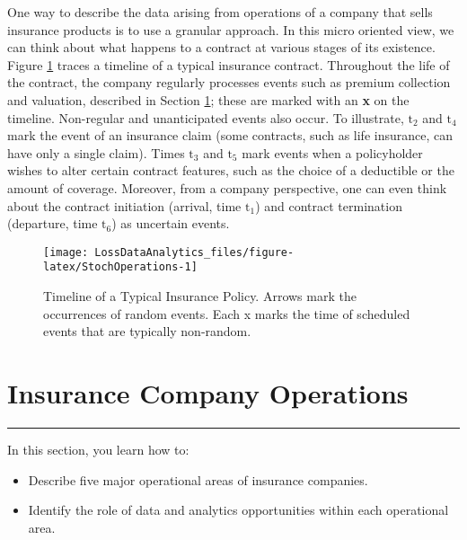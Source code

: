 \documentclass[]{book}
\providecommand{\tightlist}{%
  \setlength{\itemsep}{0pt}\setlength{\parskip}{0pt}}
\theoremstyle{definition}
\theoremstyle{definition}
\theoremstyle{definition}
\theoremstyle{remark}
\begin{document}
One way to describe the data arising from operations of a company that
sells insurance products is to use a granular approach. In this micro
oriented view, we can think about what happens to a contract at various
stages of its existence. Figure \ref{fig:StochOperations} traces a
timeline of a typical insurance contract. Throughout the life of the
contract, the company regularly processes events such as premium
collection and valuation, described in Section \ref{S:PredModApps};
these are marked with an \textbf{x} on the timeline. Non-regular and
unanticipated events also occur. To illustrate, \(\mathrm{t}_2\) and
\(\mathrm{t}_4\) mark the event of an insurance claim (some contracts,
such as life insurance, can have only a single claim). Times
\(\mathrm{t}_3\) and \(\mathrm{t}_5\) mark events when a policyholder
wishes to alter certain contract features, such as the choice of a
deductible or the amount of coverage. Moreover, from a company
perspective, one can even think about the contract initiation (arrival,
time \(\mathrm{t}_1\)) and contract termination (departure, time
\(\mathrm{t}_6\)) as uncertain events.





\begin{figure}

{\centering \texttt{[image: LossDataAnalytics\_files/figure-latex/StochOperations-1]} 

}

\caption{Timeline of a Typical Insurance Policy. Arrows
mark the occurrences of random events. Each x marks the time of
scheduled events that are typically non-random.}\label{fig:StochOperations}
\end{figure}

\section{Insurance Company Operations}\label{S:PredModApps}

\begin{center}\rule{0.5\linewidth}{\linethickness}\end{center}

In this section, you learn how to:

\begin{itemize}
\tightlist
\item
  Describe five major operational areas of insurance companies.
\item
  Identify the role of data and analytics opportunities within each
  operational area.
\end{itemize}
\end{document}
